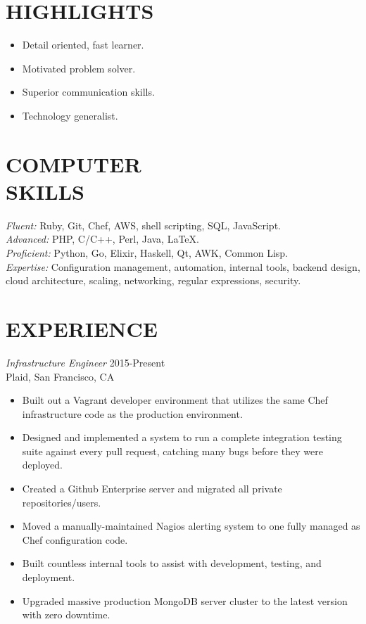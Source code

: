 \documentclass[line,margin]{res}
\begin{document}
\address{\,\,\,\,\,\,\,\,\,\,\,\,\,\,\,\,\,\,\,\,\, dana.merrick@gmail.com} %
\address{San Francisco, CA -- 978.206.1331}

\begin{resume}

\section{HIGHLIGHTS}
  \begin{itemize}  \itemsep -2pt %
    \item Detail oriented, fast learner.
    \item Motivated problem solver.
    \item Superior communication skills.
    \item Technology generalist.
  \end{itemize}
  
\section{COMPUTER \\ SKILLS}
  {\sl Fluent:}
  Ruby,
  Git,
  Chef,
  AWS,
  shell scripting,
  SQL,
  JavaScript.
  \\
  {\sl Advanced:}
  PHP,
  C/C++,
  Perl,
  Java,
  \LaTeX.
  \\
  {\sl Proficient:}
  Python,
  Go,
  Elixir,
  Haskell,
  Qt,
  AWK,
  Common Lisp.
  \\
  {\sl Expertise:}
  Configuration management,
  automation,
  internal tools,
  backend design,
  cloud architecture,
  scaling,
  networking,
  regular expressions,
  security.

\section{EXPERIENCE}
  {\sl Infrastructure Engineer}  \hfill 2015-Present \\
  Plaid,
  San Francisco, CA
  \begin{itemize}  \itemsep -2pt %
    \item Built out a Vagrant developer environment that utilizes the same Chef infrastructure code as the production environment.
    \item Designed and implemented a system to run a complete integration testing suite against every pull request, catching many bugs before they were deployed.
    \item Created a Github Enterprise server and migrated all private repositories/users.
    \item Moved a manually-maintained Nagios alerting system to one fully managed as Chef configuration code.
    \item Built countless internal tools to assist with development, testing, and deployment.
    \item Upgraded massive production MongoDB server cluster to the latest version with zero downtime.
  \end{itemize}


\end{resume}
\end{document}
